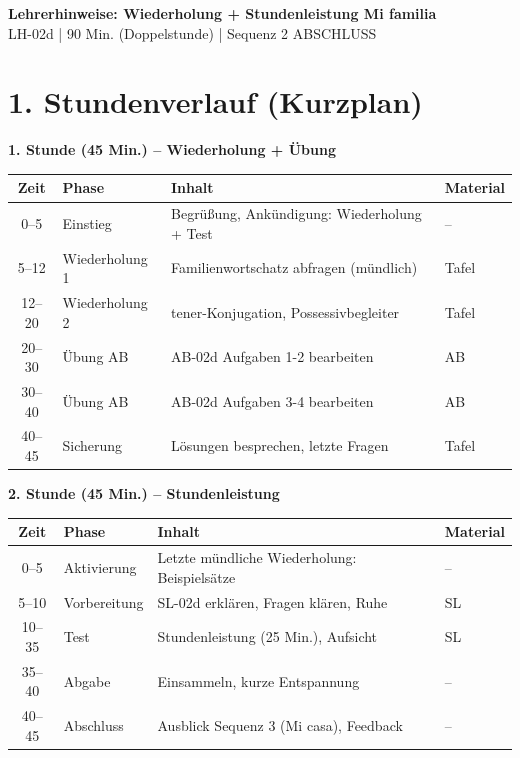 \documentclass[11pt, a4paper]{article}
\newcommand{\fachfarbe}{spanisch}
\newcommand{\thema}{Wiederholung + Stundenleistung Mi familia}
\newcommand{\sequenz}{02}
\newcommand{\block}{d}
\newcommand{\dauer}{90 Min. (Doppelstunde)}
\begin{document}

\begin{center}
    {\Large\bfseries\textcolor{\fachfarbe}{Lehrerhinweise: \thema}}\\[0.3em]
    {\normalsize LH-\sequenz\block{} | \dauer{} | Sequenz 2 ABSCHLUSS}
\end{center}

\vspace{10pt}


\section*{1. Stundenverlauf (Kurzplan)}

\textbf{1. Stunde (45 Min.) -- Wiederholung + Übung}

\begin{tabularx}{\textwidth}{|c|l|X|l|}
\hline
\textbf{Zeit} & \textbf{Phase} & \textbf{Inhalt} & \textbf{Material} \\
\hline
0--5 & Einstieg & Begrüßung, Ankündigung: Wiederholung + Test & -- \\
\hline
5--12 & Wiederholung 1 & Familienwortschatz abfragen (mündlich) & Tafel \\
\hline
12--20 & Wiederholung 2 & tener-Konjugation, Possessivbegleiter & Tafel \\
\hline
20--30 & Übung AB & AB-02d Aufgaben 1-2 bearbeiten & AB \\
\hline
30--40 & Übung AB & AB-02d Aufgaben 3-4 bearbeiten & AB \\
\hline
40--45 & Sicherung & Lösungen besprechen, letzte Fragen & Tafel \\
\hline
\end{tabularx}

\vspace{1em}

\textbf{2. Stunde (45 Min.) -- Stundenleistung}

\begin{tabularx}{\textwidth}{|c|l|X|l|}
\hline
\textbf{Zeit} & \textbf{Phase} & \textbf{Inhalt} & \textbf{Material} \\
\hline
0--5 & Aktivierung & Letzte mündliche Wiederholung: Beispielsätze & -- \\
\hline
5--10 & Vorbereitung & SL-02d erklären, Fragen klären, Ruhe & SL \\
\hline
10--35 & Test & Stundenleistung (25 Min.), Aufsicht & SL \\
\hline
35--40 & Abgabe & Einsammeln, kurze Entspannung & -- \\
\hline
40--45 & Abschluss & Ausblick Sequenz 3 (Mi casa), Feedback & -- \\
\hline
\end{tabularx}
\end{document}
